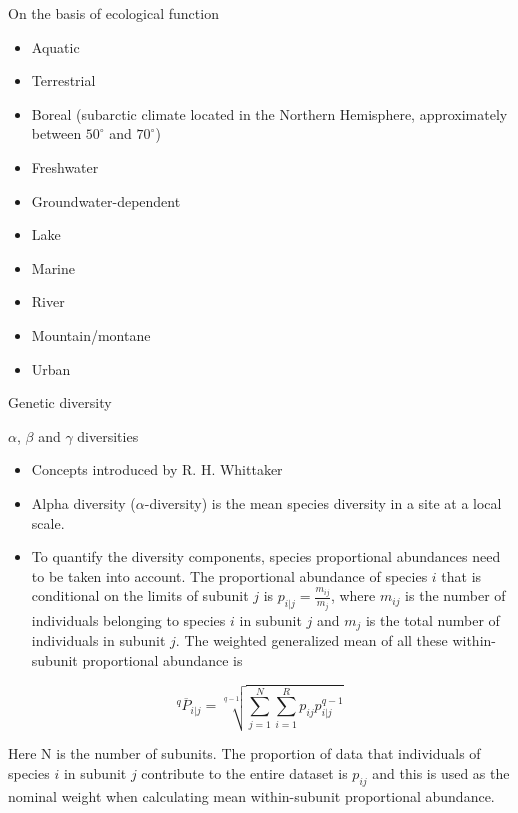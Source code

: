 \documentclass[
  ignorenonframetext,
  aspectratio=169]{beamer}
\providecommand{\tightlist}{%
  \setlength{\itemsep}{0pt}\setlength{\parskip}{0pt}}
\begin{document}
\begin{frame}{On the basis of ecological function}
\protect\hypertarget{on-the-basis-of-ecological-function}{}
\begin{itemize}
\tightlist
\item
  Aquatic
\item
  Terrestrial
\item
  Boreal (subarctic climate located in the Northern Hemisphere,
  approximately between \(50^\circ\) and \(70^\circ\))
\item
  Freshwater
\item
  Groundwater-dependent
\item
  Lake
\item
  Marine
\item
  River
\item
  Mountain/montane
\item
  Urban
\end{itemize}
\end{frame}

\begin{frame}{Genetic diversity}
\protect\hypertarget{genetic-diversity}{}
\end{frame}

\begin{frame}{\(\alpha\), \(\beta\) and \(\gamma\) diversities}
\protect\hypertarget{alpha-beta-and-gamma-diversities}{}
\footnotesize

\begin{itemize}
\tightlist
\item
  Concepts introduced by R. H. Whittaker
\item
  Alpha diversity (\(\alpha\)-diversity) is the mean species diversity
  in a site at a local scale.
\item
  To quantify the diversity components, species proportional abundances
  need to be taken into account. The proportional abundance of species
  \(i\) that is conditional on the limits of subunit \(j\) is
  \(p_{i|j} = \frac{m_{ij}}{m_j}\), where \(m_{ij}\) is the number of
  individuals belonging to species \(i\) in subunit \(j\) and \(m_j\) is
  the total number of individuals in subunit \(j\). The weighted
  generalized mean of all these within-subunit proportional abundance is
\end{itemize}

\[
{}^q\overline{P}_{i|j} = \sqrt[q-1]{\sum^N_{j=1} \sum^R_{i=1} p_{ij} p^{q-1}_{i|j}}
\]

Here N is the number of subunits. The proportion of data that
individuals of species \(i\) in subunit \(j\) contribute to the entire
dataset is \(p_{ij}\) and this is used as the nominal weight when
calculating mean within-subunit proportional abundance.
\end{frame}
\end{document}
